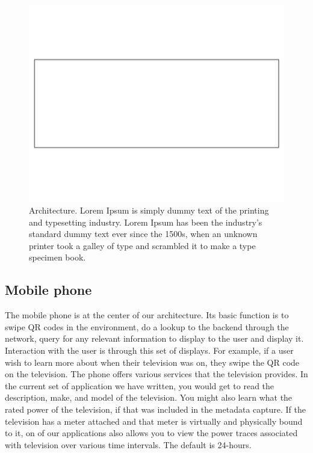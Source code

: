 \begin{figure}[htb!]
\begin{center}
\includegraphics[scale=0.5]{figs/blankrectangle}
\caption{Architecture. Lorem Ipsum is simply dummy text of the printing and typesetting industry. Lorem Ipsum has 
been the industry's standard dummy text ever since the 1500s, when an unknown printer took a galley of 
type and scrambled it to make a type specimen book.  }
\label{fig:sysarch}
\end{center}
\end{figure}

\subsection{Mobile phone}
\label{sec:mobilephone}
The mobile phone is at the center of our architecture.  Its basic function is to swipe QR codes in the environment,
do a lookup to the backend through the network, query for any relevant information to display to the user and display it.
Interaction with the user is through this set of displays.  For example, if a user wish to learn more about when
their television was on, they swipe the QR code on the television.  The phone offers various services that the television
provides.  In the current set of application we have written, you would get to read the description, make, and model of the
television.  You might also learn what the rated power of the television, if that was included in the metadata capture.
If the television has a meter attached and that meter is virtually and physically bound to it, on of our applications
also allows you to view the power traces associated with television over various time intervals.  The default is 24-hours.

